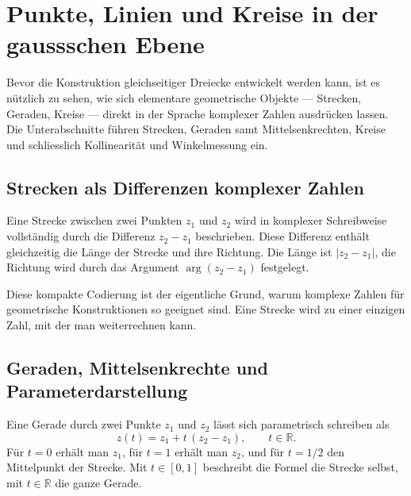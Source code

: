 %
%
\section{Punkte, Linien und Kreise in der gaussschen Ebene
\label{komplex:section:objekte}}
Bevor die Konstruktion gleichseitiger Dreiecke entwickelt werden kann,
ist es nützlich zu sehen,
wie sich elementare geometrische Objekte --- Strecken, Geraden, Kreise ---
direkt in der Sprache komplexer Zahlen ausdrücken lassen.
Die Unterabschnitte führen Strecken, Geraden samt Mittelsenkrechten,
Kreise und schliesslich Kollinearität und Winkelmessung ein.

%
%
\subsection{Strecken als Differenzen komplexer Zahlen
\label{komplex:subsection:strecken}}
Eine Strecke zwischen zwei Punkten $z_1$ und $z_2$ wird in komplexer
Schreibweise vollständig durch die Differenz $z_2 - z_1$ beschrieben.
Diese Differenz enthält gleichzeitig die Länge der Strecke und ihre
Richtung.
Die Länge ist $|z_2 - z_1|$, die Richtung wird durch das Argument
$\arg(z_2 - z_1)$ festgelegt.

Diese kompakte Codierung ist der eigentliche Grund,
warum komplexe Zahlen für geometrische Konstruktionen so geeignet sind.
Eine Strecke wird zu einer einzigen Zahl, mit der man weiterrechnen kann.

%
%
\subsection{Geraden, Mittelsenkrechte und Parameterdarstellung
\label{komplex:subsection:geraden}}
Eine Gerade durch zwei Punkte $z_1$ und $z_2$ lässt sich parametrisch
schreiben als
\begin{equation}
z(t)
=
z_1 + t \, (z_2 - z_1) ,
\qquad
t \in \mathbb{R} .
\label{komplex:eq:gerade}
\end{equation}
Für $t = 0$ erhält man $z_1$,
für $t = 1$ erhält man $z_2$,
und für $t = 1/2$ den Mittelpunkt der Strecke.
Mit $t \in [0, 1]$ beschreibt die Formel die Strecke selbst,
mit $t \in \mathbb{R}$ die ganze Gerade.

